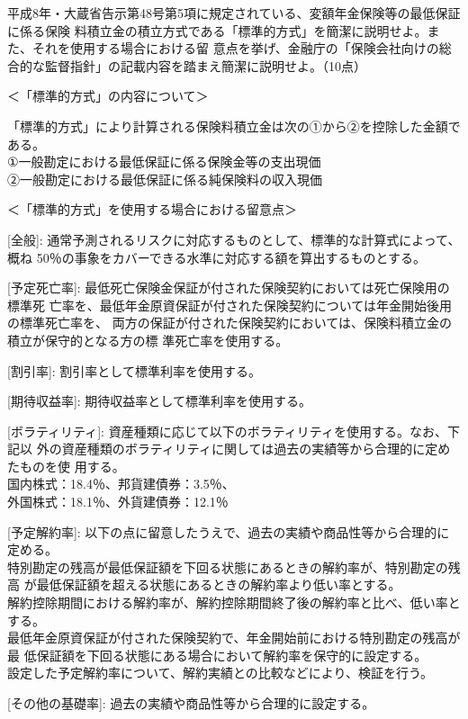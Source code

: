 \documentclass[report,gutter=10mm,fore-edge=10mm,uplatex,dvipdfmx]{jlreq}
\begin{document}
平成8年・大蔵省告示第48号第5項に規定されている、変額年金保険等の最低保証に係る保険
料積立金の積立方式である「標準的方式」を簡潔に説明せよ。また、それを使用する場合における留
意点を挙げ、金融庁の「保険会社向けの総合的な監督指針」の記載内容を踏まえ簡潔に説明せよ。（10点）

\answer{}
＜「標準的方式」の内容について＞

「標準的方式」により計算される保険料積立金は次の①から②を控除した金額である。\\
①一般勘定における最低保証に係る保険金等の支出現価\\
②一般勘定における最低保証に係る純保険料の収入現価

＜「標準的方式」を使用する場合における留意点＞

[全般]: 通常予測されるリスクに対応するものとして、標準的な計算式によって、概ね
50％の事象をカバーできる水準に対応する額を算出するものとする。

[予定死亡率]: 最低死亡保険金保証が付された保険契約においては死亡保険用の標準死
亡率を、最低年金原資保証が付された保険契約については年金開始後用の標準死亡率を、
両方の保証が付された保険契約においては、保険料積立金の積立が保守的となる方の標
準死亡率を使用する。

[割引率]: 割引率として標準利率を使用する。

[期待収益率]: 期待収益率として標準利率を使用する。

[ボラティリティ]: 資産種類に応じて以下のボラティリティを使用する。なお、下記以
外の資産種類のボラティリティに関しては過去の実績等から合理的に定めたものを使
用する。\\
国内株式：18.4％、邦貨建債券：3.5％、\\
外国株式：18.1％、外貨建債券：12.1％

[予定解約率]: 以下の点に留意したうえで、過去の実績や商品性等から合理的に定める。\\
特別勘定の残高が最低保証額を下回る状態にあるときの解約率が、特別勘定の残高
が最低保証額を超える状態にあるときの解約率より低い率とする。\\
解約控除期間における解約率が、解約控除期間終了後の解約率と比べ、低い率とする。\\
最低年金原資保証が付された保険契約で、年金開始前における特別勘定の残高が最
低保証額を下回る状態にある場合において解約率を保守的に設定する。\\
設定した予定解約率について、解約実績との比較などにより、検証を行う。

[その他の基礎率]: 過去の実績や商品性等から合理的に設定する。
\end{document}
